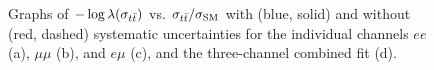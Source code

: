 \begin{figure}[htbp]
  \begin{center}
     \\
     \\
    \caption{Graphs of $-\log\lambda(\sigma_{t\bar{t}})$ vs. $\sigma_{t\bar{t}}/\sigma_{\rm SM}$ with (blue, solid) and without (red, dashed) systematic uncertainties for the individual channels $ee$ (a), $\mu\mu$ (b), and $e\mu$ (c), and the three-channel combined fit (d).}
    \label{fig:dilep_profiles}
  \end{center}
\end{figure}

